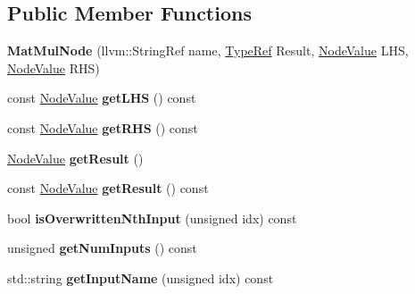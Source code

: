 \subsection*{Public Member Functions}
\begin{DoxyCompactItemize}
\item 
\mbox{\label{classglow_1_1_mat_mul_node_aa1321cd20183e52ff7da07d2fc4dd378}} 
{\bfseries Mat\+Mul\+Node} (llvm\+::\+String\+Ref name, \hyperlink{structglow_1_1_type}{Type\+Ref} Result, \hyperlink{structglow_1_1_node_value}{Node\+Value} L\+HS, \hyperlink{structglow_1_1_node_value}{Node\+Value} R\+HS)
\item 
\mbox{\label{classglow_1_1_mat_mul_node_ac36a1bc8da07f303cb4a2d948fa3ab2c}} 
const \hyperlink{structglow_1_1_node_value}{Node\+Value} {\bfseries get\+L\+HS} () const
\item 
\mbox{\label{classglow_1_1_mat_mul_node_a35fb50a84757feb2eb0d5e354ece1b02}} 
const \hyperlink{structglow_1_1_node_value}{Node\+Value} {\bfseries get\+R\+HS} () const
\item 
\mbox{\label{classglow_1_1_mat_mul_node_a64237eed51c6009e3aca21ef77190b85}} 
\hyperlink{structglow_1_1_node_value}{Node\+Value} {\bfseries get\+Result} ()
\item 
\mbox{\label{classglow_1_1_mat_mul_node_a6085135cc1b52e31e50e4e736e2be101}} 
const \hyperlink{structglow_1_1_node_value}{Node\+Value} {\bfseries get\+Result} () const
\item 
\mbox{\label{classglow_1_1_mat_mul_node_a29449e56de34cb1c4280d2d01f6b5e27}} 
bool {\bfseries is\+Overwritten\+Nth\+Input} (unsigned idx) const
\item 
\mbox{\label{classglow_1_1_mat_mul_node_a7c8b4cd13ff9e34a538de4766d0006e5}} 
unsigned {\bfseries get\+Num\+Inputs} () const
\item 
\mbox{\label{classglow_1_1_mat_mul_node_a591a630d369d2261f98b218defc594ba}} 
std\+::string {\bfseries get\+Input\+Name} (unsigned idx) const
\item 

\end{DoxyCompactItemize}
